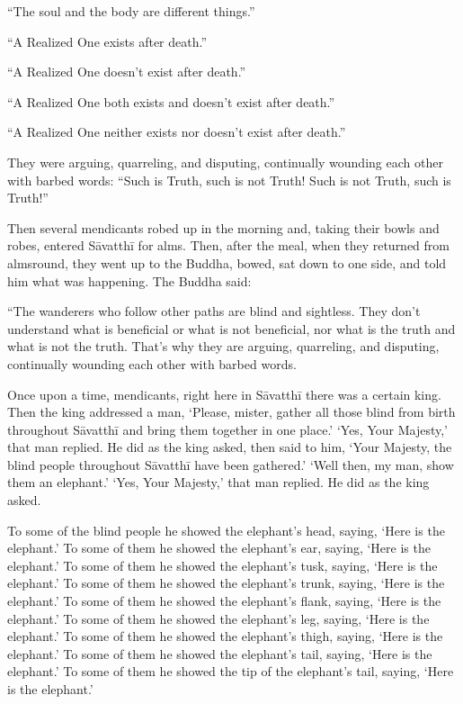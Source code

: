 \documentclass[12pt,openany]{book}%
\begin{document}
“The soul and the body are different things.” 

“A Realized One exists after death.” 

“A Realized One doesn’t exist after death.” 

“A Realized One both exists and doesn’t exist after death.” 

“A Realized One neither exists nor doesn’t exist after death.” 

They were arguing, quarreling, and disputing, continually wounding each other with barbed words: “Such is Truth, such is not Truth! Such is not Truth, such is Truth!” 

Then several mendicants robed up in the morning and, taking their bowls and robes, entered \textsanskrit{Sāvatthī} for alms. Then, after the meal, when they returned from almsround, they went up to the Buddha, bowed, sat down to one side, and told him what was happening. The Buddha said: 

“The wanderers who follow other paths are blind and sightless. They don't understand what is beneficial or what is not beneficial, nor what is the truth and what is not the truth. That’s why they are arguing, quarreling, and disputing, continually wounding each other with barbed words. 

Once upon a time, mendicants, right here in \textsanskrit{Sāvatthī} there was a certain king. Then the king addressed a man, ‘Please, mister, gather all those blind from birth throughout \textsanskrit{Sāvatthī} and bring them together in one place.’ ‘Yes, Your Majesty,’ that man replied. He did as the king asked, then said to him, ‘Your Majesty, the blind people throughout \textsanskrit{Sāvatthī} have been gathered.’ ‘Well then, my man, show them an elephant.’ ‘Yes, Your Majesty,’ that man replied. He did as the king asked. 

To some of the blind people he showed the elephant’s head, saying, ‘Here is the elephant.’ To some of them he showed the elephant’s ear, saying, ‘Here is the elephant.’ To some of them he showed the elephant’s tusk, saying, ‘Here is the elephant.’ To some of them he showed the elephant’s trunk, saying, ‘Here is the elephant.’ To some of them he showed the elephant’s flank, saying, ‘Here is the elephant.’ To some of them he showed the elephant’s leg, saying, ‘Here is the elephant.’ To some of them he showed the elephant’s thigh, saying, ‘Here is the elephant.’ To some of them he showed the elephant’s tail, saying, ‘Here is the elephant.’ To some of them he showed the tip of the elephant’s tail, saying, ‘Here is the elephant.’ 
\end{document}
